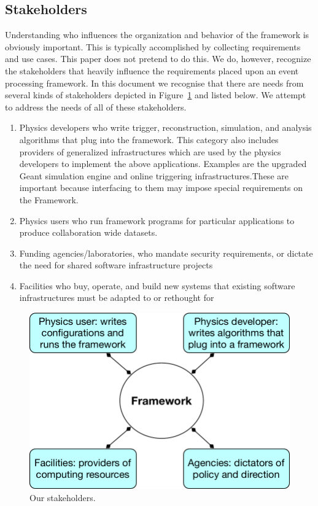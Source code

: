 \documentclass[12pt,a4paper]{article}
\begin{document}
\subsection{Stakeholders}
\label{sec:stakeholders}

Understanding who influences the organization and behavior of the
framework is obviously important. This is typically accomplished by
collecting requirements and use cases. This paper does not pretend to
do this. We do, however, recognize the stakeholders that heavily
influence the requirements placed upon an event processing
framework. In this document we recognise that there are needs from
several kinds of stakeholders depicted in
Figure~\ref{fig:stakeholders} and listed below.  We attempt to address
the needs of all of these stakeholders.

\begin{enumerate}
\item
    Physics developers who write trigger, reconstruction, simulation,
    and analysis algorithms that plug into the framework. This
    category also includes providers of generalized infrastructures
    which are used by the physics developers to implement the above
    applications. Examples are the upgraded Geant simulation engine
    and online triggering infrastructures.These are important because
    interfacing to them may impose special requirements on the
    Framework.
\item
    Physics users who run framework programs for particular
    applications to produce collaboration wide datasets.
\item
    Funding agencies/laboratories, who mandate security requirements,
    or dictate the need for shared software infrastructure projects
\item
    Facilities who buy, operate, and build new systems that existing
    software infrastructures must be adapted to or rethought for
\end{enumerate}

\begin{figure}[hbt] %
\centering
\includegraphics[width=.75\textwidth]{stakeholders.pdf}
\caption{Our stakeholders. \label{fig:stakeholders}}
\end{figure}
\end{document}
